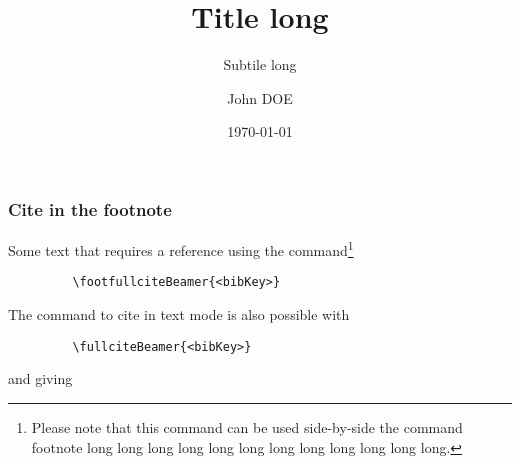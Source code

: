 \documentclass[notheorems, noamsthm, aspectratio=169, 10pt]{beamer}
\title[shorttitle]{Title long}
\subtitle[shortsubtitle]{Subtile long}
\date[shortdate]{\today}
\author[john.doe@mail.com]{John DOE\inst{1}}
\institute[shortinstitute]{\inst{1} An Awesome Company}
\begin{document}

\begin{frame}
   \frametitle{Cite in the footnote}

   Some text that requires a reference%
   using the command\footnote{Please note that this command can be used side-by-side the command footnote long long long long long long long long long long long long.}
   \begin{verbatim}
         \footfullciteBeamer{<bibKey>}
   \end{verbatim}

   The command to cite in text mode is also possible with
   \begin{verbatim}
         \fullciteBeamer{<bibKey>}
   \end{verbatim}
   and giving %
\end{frame}
\end{document}
